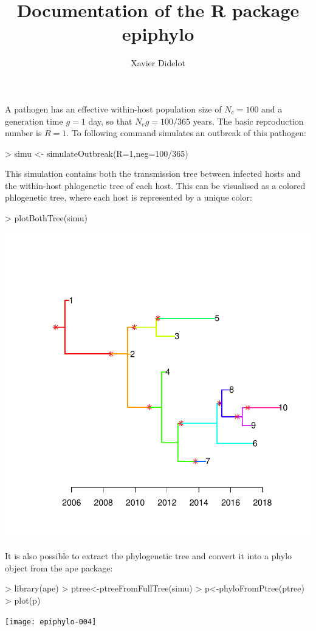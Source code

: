 \documentclass[a4paper]{article}
\title{Documentation of the R package epiphylo}
\author{Xavier Didelot}
\begin{document}


\maketitle


A pathogen has an effective within-host population size of $N_e=100$ and a generation time $g=1$ day, so that $N_e g=100/365$ years. The basic reproduction number is $R=1$. To following command simulates an outbreak of this pathogen: 
\begin{Schunk}
\begin{Sinput}
> simu <- simulateOutbreak(R=1,neg=100/365)
\end{Sinput}
\end{Schunk}

This simulation contains both the transmission tree between infected hosts and the within-host phlogenetic tree of each host. This can be visualised as a colored phlogenetic tree, where each host is represented by a unique color:

\begin{center}
\begin{Schunk}
\begin{Sinput}
> plotBothTree(simu)
\end{Sinput}
\end{Schunk}
\includegraphics{epiphylo-003}
\end{center}

It is also possible to extract the phylogenetic tree and convert it into a phylo object from the ape package:

\begin{Schunk}
\begin{Sinput}
> library(ape)
> ptree<-ptreeFromFullTree(simu)
> p<-phyloFromPtree(ptree)
> plot(p)
\end{Sinput}
\end{Schunk}
\texttt{[image: epiphylo-004]}
\end{document}
